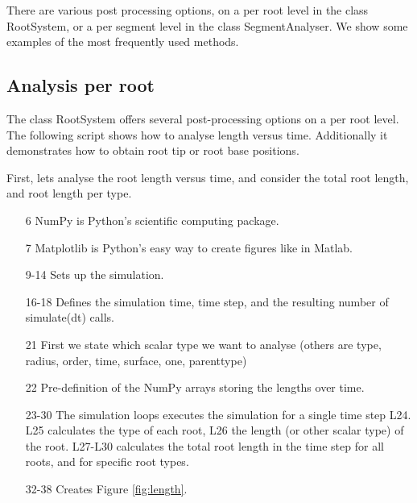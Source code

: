 \documentclass[a4paper]{article}
\begin{document}
There are various post processing options, on a per root level in the class RootSystem, or a per segment level in the class SegmentAnalyser. We show some examples of the most frequently used methods. 

\subsection{Analysis per root}

The class RootSystem offers several post-processing options on a per root level. The following script shows how to analyse length versus time. Additionally it demonstrates how to obtain root tip or root base positions. 

First, lets analyse the root length versus time, and consider the total root length, and root length per type. 



\begin{itemize}

\item[6] NumPy is Python's scientific computing package.
\item[7] Matplotlib is Python's easy way to create figures like in Matlab.

\item[9-14] Sets up the simulation.

\item[16-18] Defines the simulation time, time step, and the resulting number of simulate(dt) calls. 

\item[21] First we state which scalar type we want to analyse (others are type, radius, order, time, surface, one, parenttype)

\item[22] Pre-definition of the NumPy arrays storing the lengths over time. 

\item[23-30] The simulation loops executes the simulation for a single time step L24. L25 calculates the type of each root, L26 the length (or other scalar type) of the root. L27-L30 calculates the total root length in the time step for all roots, and for specific root types.

\item[32-38] Creates Figure \ref{fig:length}.

\end{itemize}
\end{document}
